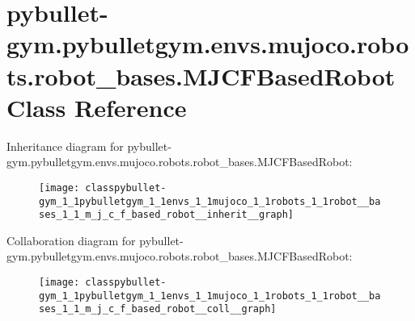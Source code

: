 \hypertarget{classpybullet-gym_1_1pybulletgym_1_1envs_1_1mujoco_1_1robots_1_1robot__bases_1_1_m_j_c_f_based_robot}{}\section{pybullet-\/gym.pybulletgym.\+envs.\+mujoco.\+robots.\+robot\+\_\+bases.\+M\+J\+C\+F\+Based\+Robot Class Reference}
\label{classpybullet-gym_1_1pybulletgym_1_1envs_1_1mujoco_1_1robots_1_1robot__bases_1_1_m_j_c_f_based_robot}


Inheritance diagram for pybullet-\/gym.pybulletgym.\+envs.\+mujoco.\+robots.\+robot\+\_\+bases.\+M\+J\+C\+F\+Based\+Robot\+:
\nopagebreak
\begin{figure}[H]
\begin{center}
\leavevmode
\texttt{[image: classpybullet-gym\_1\_1pybulletgym\_1\_1envs\_1\_1mujoco\_1\_1robots\_1\_1robot\_\_bases\_1\_1\_m\_j\_c\_f\_based\_robot\_\_inherit\_\_graph]}
\end{center}
\end{figure}


Collaboration diagram for pybullet-\/gym.pybulletgym.\+envs.\+mujoco.\+robots.\+robot\+\_\+bases.\+M\+J\+C\+F\+Based\+Robot\+:
\nopagebreak
\begin{figure}[H]
\begin{center}
\leavevmode
\texttt{[image: classpybullet-gym\_1\_1pybulletgym\_1\_1envs\_1\_1mujoco\_1\_1robots\_1\_1robot\_\_bases\_1\_1\_m\_j\_c\_f\_based\_robot\_\_coll\_\_graph]}
\end{center}
\end{figure}
